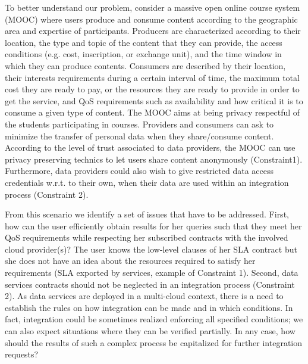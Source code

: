 To better understand our problem, consider a massive open online course system (MOOC) where users produce and consume content according to the geographic area and expertise of participants. 
Producers are characterized according to their location, the type and topic of the content that they can provide, the access conditions (e.g. cost, inscription, or exchange unit), and the time window in which they can produce contents. 
Consumers are described by their location, their interests requirements during a certain interval of time, the maximum total cost they are ready to pay, or the resources they are ready to provide in order to get the service, and QoS requirements such as availability and how critical it is to consume a given type of content. 
The MOOC  aims at being privacy respectful of the students participating in courses.
 Providers  and consumers can ask to minimize the transfer of personal data  when they share/consume content.  According to the level of trust associated to data providers, the MOOC can use privacy preserving technics to let users share content anonymously  (Constraint1). Furthermore,  data providers could  also wish to give restricted data access credentials w.r.t. to their own, when their data are used  within  an integration process (Constraint 2).  
 


  From this scenario we identify a set of issues that have to be addressed. First, how can the user efficiently obtain  results for her queries such that they meet her QoS requirements while respecting her subscribed contracts with the involved cloud provider(s)?  The user knows the low-level clauses of her SLA contract but she does not have an idea about the resources required to satisfy her requirements (SLA exported by services, example of Constraint 1).  Second, data services contracts should not be neglected in an integration process (Constraint 2).   As data services are deployed in a multi-cloud context, there is a need to establish the rules on how integration can be made and in which conditions. In fact, integration could be sometimes realized enforcing all specified conditions; we can also expect situations where they can be verified partially. In any case, how should the results of  such a  complex process  be capitalized for further integration requests?
  
